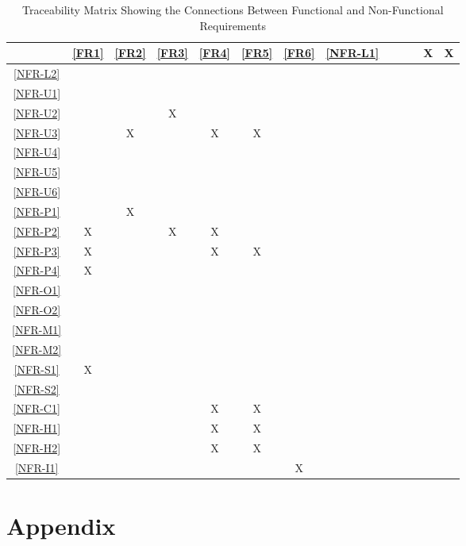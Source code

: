 \documentclass[12pt, titlepage]{article}
\begin{document}
\begin{table}[h!]
\centering
\begin{tabular}{|c|c|c|c|c|c|c|}
\hline        
	 & \ref{FR1} & \ref{FR2}& \ref{FR3} & \ref{FR4} & \ref{FR5}& \ref{FR6} &
\hline
\ref{NFR-L1}     &  &  &  & X & X & \\ \hline
\ref{NFR-L2}     &  &  &  &  &  & \\ \hline
\ref{NFR-U1}     &  &  &  &  &  & \\ \hline
\ref{NFR-U2}     &  &  & X &  &  & \\ \hline
\ref{NFR-U3}     &  & X &  & X & X & \\ \hline
\ref{NFR-U4}     &  &  &  &  &  &  \\ \hline
\ref{NFR-U5}     &  &  &  &  &  & \\ \hline
\ref{NFR-U6}     &  &  &  &  &  & \\ \hline
\ref{NFR-P1}     &  & X &  &  &  & \\ \hline
\ref{NFR-P2}     & X &  & X & X &  & \\ \hline
\ref{NFR-P3}     & X &  &  & X & X & \\ \hline
\ref{NFR-P4}     & X &  &  &  &  & \\ \hline
\ref{NFR-O1}     &  &  &  &  &  & \\ \hline
\ref{NFR-O2}     &  &  &  &  &  & \\ \hline
\ref{NFR-M1}     &  &  &  &  &  & \\ \hline
\ref{NFR-M2}     &  &  &  &  &  & \\ \hline
\ref{NFR-S1}     & X &  &  &  &  & \\ \hline
\ref{NFR-S2}     &  &  &  &  &  & \\ \hline
\ref{NFR-C1}     &  &  &  & X & X & \\ \hline
\ref{NFR-H1}     &  &  &  & X & X & \\ \hline
\ref{NFR-H2}     &  &  &  & X & X & \\ \hline
\ref{NFR-I1}     &  &  &  &  &  & X\\ \hline
\hline
\end{tabular}
\caption{Traceability Matrix Showing the Connections Between Functional and Non-Functional Requirements}
\label{Table:trace}
\end{table}

\clearpage
\newpage
\section{Appendix}
\end{document}
